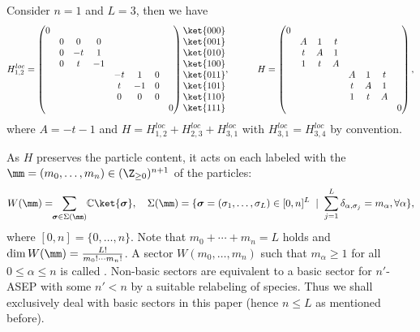 \begin{exam}
Consider $n = 1$ and $L = 3$, then we have
\[
H^{loc}_{1,2} = \begin{pmatrix}
0
\\ & 0 & 0 & 0
\\ & 0 & -t & 1
\\ & 0 & t & -1
\\ &&&& -t & 1 & 0
\\ &&&& t & -1 & 0
\\ &&&& 0 & 0 & 0
\\ &&&&&&&0
\end{pmatrix}
\begin{matrix}
\ket{000} \\ \ket{001} \\ \ket{010} \\ \ket{100} \\ \ket{011} \\ \ket{101} \\ \ket{110} \\ \ket{111}
\end{matrix},
\qquad\quad
H = \begin{pmatrix}
0
\\ & A & 1 & t
\\ & t & A & 1
\\ & 1 & t & A
\\ &&&& A & 1 & t
\\ &&&& t & A & 1
\\ &&&& 1 & t & A
\\ &&&&&&&0
\end{pmatrix},
\]
where $A = -t-1$ and $H = H_{1,2}^{loc} + H_{2,3}^{loc} + H_{3,1}^{loc}$ with $H_{3,1}^{loc} = H_{3,4}^{loc}$ by convention.
\end{exam}

As $H$ preserves the particle content, 
it acts on each  labeled with 
the  $\mm=(m_0, \ldots, m_n) \in (\Z_{\ge 0})^{n+1}$ of the particles:
\begin{align}\label{a:VP}
W(\mm) =\!\!
\sum_{{\boldsymbol \sigma} \in 
\Sigma(\mm)}\! \mathbb{C}\ket{{\boldsymbol \sigma}}, \quad
\Sigma(\mm) = 
\{{\boldsymbol \sigma}=(\sigma_1, \ldots, \sigma_L) \in [0,n]^L\; \mid \;
\sum_{j=1}^L \delta_{\alpha,\sigma_j} = m_\alpha,\forall \alpha\},
\end{align}
where $[0, n] = \{0, \ldots, n\}$.
Note that $m_0 + \cdots + m_n = L$ holds and $\dim W(\mm) = \frac{L!}{m_0! \cdots m_n!}$.
A sector $W(m_0,\ldots, m_n)$ such that $m_\alpha \ge 1$ for all $0 \le \alpha \le n$ is called .
Non-basic sectors are equivalent to a basic sector for $n'$-ASEP with some $n' < n$ by a suitable relabeling of species.
Thus we shall exclusively deal with basic sectors in this paper
(hence $n \le L$ as mentioned before).


